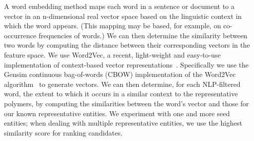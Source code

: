 A word embedding method  
maps each word
in a sentence or document to a vector in an n-dimensional real vector space
based on the linguistic context in which the word appears. (This mapping may
be based, for example, on co-occurrence frequencies of words.) 
We can then
determine the similarity between two words by computing the distance between
their corresponding vectors in the feature space.
We use Word2Vec, a recent, light-weight and easy-to-use implementation of context-based vector representations~\cite{mikolov2013efficient,mikolov2013distributed}.
Specifically we use the Gensim continuous bag-of-words
(CBOW) implementation of the Word2Vec
algorithm~\cite{rehurek2010software} to generate vectors.
We can then determine, for each NLP-filtered word, the extent to which it occurs
in a similar context to the representative polymers, by computing the similarities
between the word's vector and those for our known representative entities. 
We experiment with one and more seed entities; when dealing with multiple representative entities,
we use the highest similarity score for ranking candidates.

